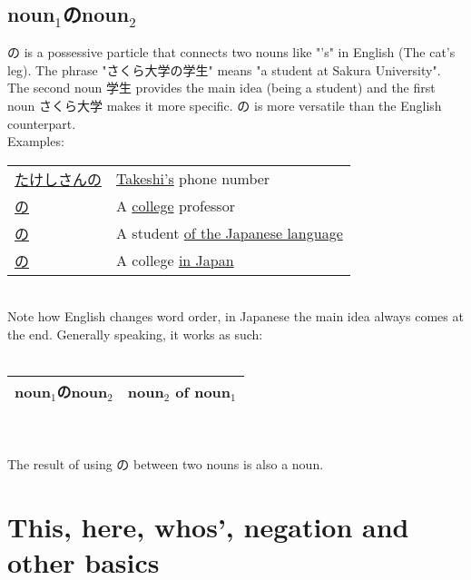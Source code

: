 \documentclass{article}
\newcommand{\grule}[2]{
	\,\\\-\quad 
	{\renewcommand{\arraystretch}{1.5}
	\begin{tabular}{|ll|}
		\hline
		#1 &\quad #2 \\
		\hline
	\end{tabular}
	}\\\\
}
\newenvironment{gex}
{
	\,\\
	\renewcommand{\arraystretch}{1.5}
    \begin{tabular}{m{20em} l}
}
{
	\end{tabular}
	\renewcommand{\arraystretch}{1}
	\\
}
\begin{document}
   \subsection{noun$_1$のnoun$_2$}
   の is a possessive particle that connects two nouns like "'s" in English (The cat's leg). The phrase "さくら大学の学生" means "a student at Sakura University". The second noun 学生 provides the main idea (being a student) and the first noun さくら大学 makes it more specific. の is more versatile than the English counterpart. \\
   Examples:
   \begin{gex}
   \underline{たけしさんの}\ruby{電話}{でんわ}\ruby{番号}{ばんごう}&\underline{Takeshi's} phone number\\
   \underline{\ruby{大学}{だいがく}の}\ruby{先生}{せんせい}&A \underline{college} professor\\
   \underline{\ruby{日本}{にほん}\ruby{語}{ご}の}\ruby{学生}{がくせい}&A student \underline{of the Japanese language}\\
   \underline{\ruby{日本}{にほん}の}\ruby{大学}{だいがく}&A college \underline{in Japan}
   \end{gex}
   Note how English changes word order, in Japanese the main idea always comes at the end. Generally speaking, it works as such: \\
   \grule{noun$_1$のnoun$_2$}{noun$_2$ of noun$_1$}
   The result of using の between two nouns is also a noun.
   
   \newpage
      
   
   \section{This, here, whos', negation and other basics}
\end{document}
